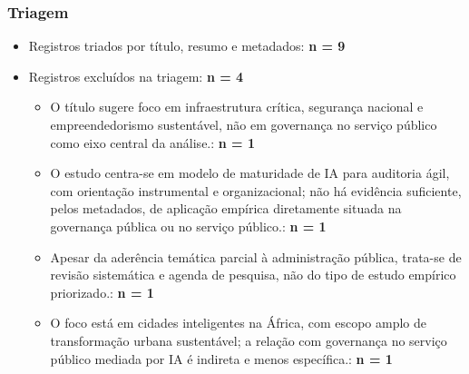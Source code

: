 \documentclass[12pt,a4paper]{article}
\begin{document}
\subsubsection{Triagem}
\label{sec:org7993351}
\begin{itemize}
\item Registros triados por título, resumo e metadados: \textbf{n = 9}
\item Registros excluídos na triagem: \textbf{n = 4}
\begin{itemize}
\item O título sugere foco em infraestrutura crítica, segurança nacional e empreendedorismo sustentável, não em governança no serviço público como eixo central da análise.: \textbf{n = 1}
\item O estudo centra-se em modelo de maturidade de IA para auditoria ágil, com orientação instrumental e organizacional; não há evidência suficiente, pelos metadados, de aplicação empírica diretamente situada na governança pública ou no serviço público.: \textbf{n = 1}
\item Apesar da aderência temática parcial à administração pública, trata-se de revisão sistemática e agenda de pesquisa, não do tipo de estudo empírico priorizado.: \textbf{n = 1}
\item O foco está em cidades inteligentes na África, com escopo amplo de transformação urbana sustentável; a relação com governança no serviço público mediada por IA é indireta e menos específica.: \textbf{n = 1}
\end{itemize}
\end{itemize}
\end{document}
